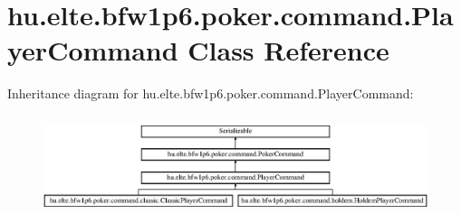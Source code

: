 \hypertarget{classhu_1_1elte_1_1bfw1p6_1_1poker_1_1command_1_1_player_command}{}\section{hu.\+elte.\+bfw1p6.\+poker.\+command.\+Player\+Command Class Reference}
\label{classhu_1_1elte_1_1bfw1p6_1_1poker_1_1command_1_1_player_command}
Inheritance diagram for hu.\+elte.\+bfw1p6.\+poker.\+command.\+Player\+Command\+:\begin{figure}[H]
\begin{center}
\leavevmode
\includegraphics[height=2.962963cm]{classhu_1_1elte_1_1bfw1p6_1_1poker_1_1command_1_1_player_command}
\end{center}
\end{figure}
